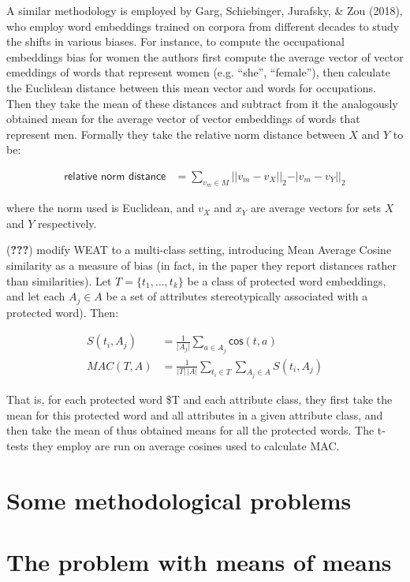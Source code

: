 \documentclass[10pt,dvipsnames,enabledeprecatedfontcommands]{scrartcl}
\begin{document}
A similar methodology is employed by Garg, Schiebinger, Jurafsky, \& Zou
(2018), who employ word embeddings trained on corpora from different
decades to study the shifts in various biases. For instance, to compute
the occupational embeddings bias for women the authors first compute the
average vector of vector emeddings of words that represent women (e.g.
``she'', ``female''), then calculate the Euclidean distance between this
mean vector and words for occupations. Then they take the mean of these
distances and subtract from it the analogously obtained mean for the
average vector of vector embeddings of words that represent men.
Formally they take the relative norm distance between \(X\) and \(Y\) to
be:

\begin{align}
\textsf{relative norm distance} & = \sum_{v_m\in M} \vert \vert v_m - v_X\vert \vert_2 - \vert v_m - v_Y\vert \vert_2
\end{align}

\noindent where the norm used is Euclidean, and \(v_X\) and \(x_Y\) are
average vectors for sets \(X\) and \(Y\) respectively.

({\textbf{???}}) modify WEAT to a multi-class setting, introducing Mean
Average Cosine similarity as a measure of bias (in fact, in the paper
they report distances rather than similarities). Let
\(T = \{t_1, \dots, t_k\}\) be a class of protected word embeddings, and
let each \(A_j\in A\) be a set of attributes stereotypically associated
with a protected word). Then:

\begin{align}
S(t_i, A_j) & = \frac{1}{\vert A_j\vert}\sum_{a\in A_j}\mathsf{cos}(t,a) \\
MAC(T,A) & = \frac{1}{\vert T \vert \,\vert A\vert}\sum_{t_i \in T }\sum_{A_j \in A} S(t_i,A_j)
\end{align}

That is, for each protected word \$T and each attribute class, they
first take the mean for this protected word and all attributes in a
given attribute class, and then take the mean of thus obtained means for
all the protected words. The t-tests they employ are run on average
cosines used to calculate MAC.

\section{Some methodological
problems}\label{some-methodological-problems}

\section{The problem with means of
means}\label{the-problem-with-means-of-means}
\end{document}
